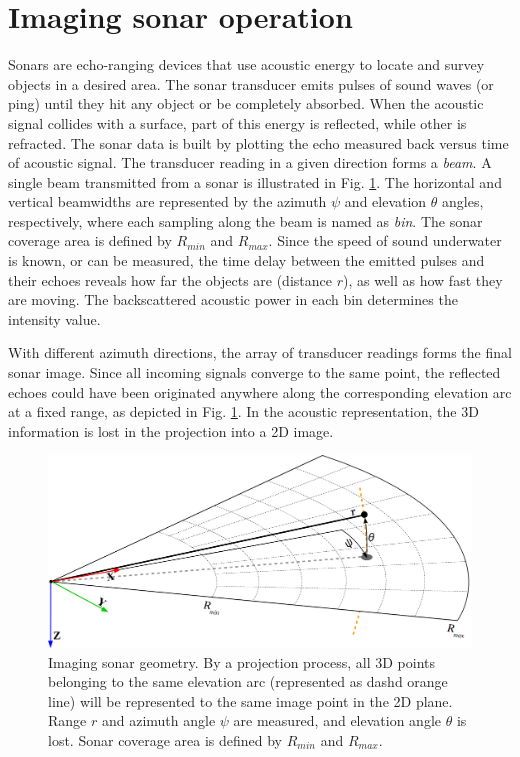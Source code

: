 \documentclass[final,5p,times]{elsarticle}
\begin{document}

\section{Imaging sonar operation}
\label{sonar:operation}

Sonars are echo-ranging devices that use acoustic energy to locate and survey
objects in a desired area. The sonar transducer emits pulses of sound waves
(or ping) until they hit any object or be completely absorbed. When the
acoustic signal collides with a surface, part of this energy is reflected,
while other is refracted. The sonar data is built by plotting the echo measured back versus time of acoustic signal. The transducer reading in a given direction forms a \textit{beam}. A single beam transmitted from a sonar is illustrated in Fig. \ref{fig:sonar_geometry}. The horizontal and vertical beamwidths are represented by the azimuth $\psi$ and elevation $\theta$ angles, respectively, where each sampling along the beam is named as \textit{bin}. The sonar coverage area is defined by $R_{min}$ and $R_{max}$. Since the speed of sound underwater is known, or can be measured, the time delay between the emitted pulses and their echoes reveals how far the objects are (distance $r$), as well as how fast they are moving. The backscattered acoustic power in each bin determines the intensity value.

With different azimuth directions, the array of transducer readings forms the
final sonar image. Since all incoming signals converge to the same point, the
reflected echoes could have been originated anywhere along the corresponding
elevation arc at a fixed range, as depicted in Fig. \ref{fig:sonar_geometry}.
In the acoustic representation, the 3D information is lost in the projection
into a 2D image.

\begin{figure}[t]
    \includegraphics[width=\columnwidth]{figs/sonar_geometry_2}
    \captionsetup{justification=justified}
    \caption{Imaging sonar geometry. By a projection process, all 3D points  belonging to the same elevation arc (represented as dashd orange line) will be represented to the same image point in the 2D plane. Range $r$ and azimuth angle $\psi$ are measured, and elevation angle $\theta$ is lost. Sonar coverage area is defined by $R_{min}$ and $R_{max}$.}
    \label{fig:sonar_geometry}
\end{figure}
\end{document}
